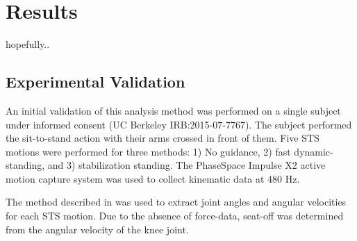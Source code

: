 \section{Results}
hopefully..

\subsection{Experimental Validation}
An initial validation of this analysis method was performed on a single subject under informed consent (UC Berkeley IRB:2015-07-7767). The subject performed the sit-to-stand action with their arms crossed in front of them. Five STS motions were performed for three methods: 1) No guidance, 2) fast dynamic-standing, and 3) stabilization standing. The PhaseSpace Impulse X2  active motion capture system was used to collect kinematic data at 480 Hz. 

The method described in \cite{matthew2016} was used to extract joint angles and angular velocities for each STS motion. Due to the absence of force-data, seat-off was determined from the angular velocity of the knee joint. 


